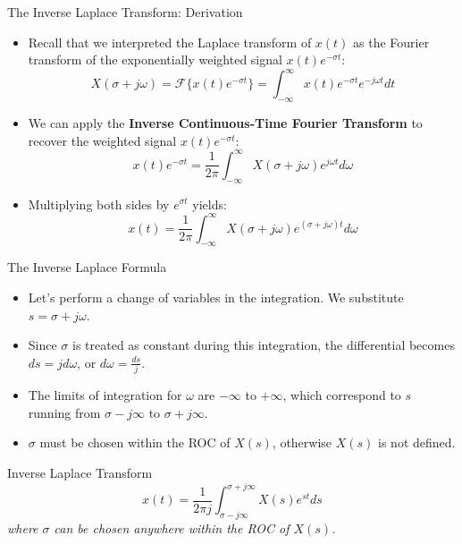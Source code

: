 \begin{frame}{The Inverse Laplace Transform: Derivation}
    \begin{itemize}
        \item Recall that we interpreted the Laplace transform of $x(t)$ as the Fourier transform of the exponentially weighted signal $x(t)e^{-\sigma t}$:
              \begin{equation*}
                  X(\sigma + j\omega) = \mathcal{F} \{ x(t)e^{-\sigma t} \} = \int_{-\infty}^{\infty} x(t)e^{-\sigma t} e^{-j\omega t} dt
              \end{equation*}
        \item We can apply the \textbf{Inverse Continuous-Time Fourier Transform} to recover the weighted signal $x(t)e^{-\sigma t}$:
              \begin{equation*}
                  x(t)e^{-\sigma t} = \frac{1}{2\pi} \int_{-\infty}^{\infty} X(\sigma + j\omega) e^{j\omega t} d\omega
              \end{equation*}
        \item Multiplying both sides by $e^{\sigma t}$ yields:
              \begin{equation*}
                  x(t) = \frac{1}{2\pi} \int_{-\infty}^{\infty} X(\sigma + j\omega) e^{(\sigma + j\omega)t} d\omega
              \end{equation*}
    \end{itemize}
\end{frame}

\begin{frame}{The Inverse Laplace Formula}
    \begin{itemize}
        \item Let's perform a change of variables in the integration. We substitute $s = \sigma + j\omega$.
        \item Since $\sigma$ is treated as constant during this integration, the differential becomes $ds = j d\omega$, or $d\omega = \frac{ds}{j}$.
        \item The limits of integration for $\omega$ are $-\infty$ to $+\infty$, which correspond to $s$ running from $\sigma - j\infty$ to $\sigma + j\infty$.
        \item $\sigma$ must be chosen within the ROC of $X(s)$, otherwise $X(s)$ is not defined.
    \end{itemize}

    \vspace{0.3cm}
    \begin{conceptbox}{Inverse Laplace Transform}
        \vspace{-0.2cm}
        \begin{equation*}
            x(t) = \frac{1}{2\pi j} \int_{\sigma - j\infty}^{\sigma + j\infty} X(s) e^{st} ds
        \end{equation*}
        \textit{where  $\sigma$ can be chosen anywhere within the ROC of $X(s)$.}
    \end{conceptbox}
\end{frame}

